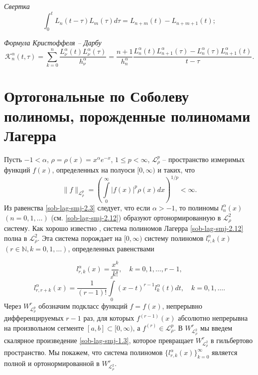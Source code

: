 \textit{Свертка}
\begin{equation}
\label{sob-lag-smj-2.15}
\int_0^{t} L_{n}(t-\tau) L_{m}(\tau) d\tau = L_{n+m}(t) - L_{n+m+1}(t);
\end{equation}

\textit{Формула Кристоффеля -- Дарбу}
\begin{equation}\label{sob-lag-smj-2.16}
\mathcal{K}_n^\alpha(t,\tau)=
\sum\limits_{k=0}^{n}\frac{L_\nu^\alpha(t)L_\nu^\alpha(\tau)}{h_\nu^\alpha}=
\frac{n+1}{h_n^\alpha}
\frac{L_n^\alpha(t)L_{n+1}^\alpha(\tau) - L_n^\alpha(\tau)L_{n+1}^\alpha(t)}{t-\tau}.
\end{equation}





\section{Ортогональные по Соболеву полиномы, порожденные полиномами Лагерра}
Пусть $-1<\alpha$,  $\rho=\rho(x)=x^\alpha e^{-x}$, $1\le p<\infty $,  $\mathcal{L}_{\rho}^p$ -- пространство измеримых функций $f(x)$, определенных на полуоси $[0,\infty)$ и таких, что
     $$
\|f\|_{\mathcal{L}_{\rho}^p}=
\left(\int\limits_0^\infty|f(x)|^p\rho(x)dx\right)^{1/p}<\infty.
    $$
Из равенства \eqref{sob-lag-smj-2.3} следует, что если $\alpha>-1$, то полиномы $l_n^{\alpha}(x)$ $(n=0,1,\ldots)$ (см. \eqref{sob-lag-smj-2.12})
образуют ортонормированную  в $\mathcal{L}_\rho^2$  систему. Как хорошо известно \cite{Haar-Tcheb-Sege}, система полиномов Лагерра  \eqref{sob-lag-smj-2.12} полна в $\mathcal{L}_\rho^2$.   Эта система порождает на $[0,\infty)$ систему полиномов $l_{r,k}^{\alpha}(x)$ $(r \in \mathbb{N}, k=0,1,\ldots)$, определенных равенствами

  \begin{equation}\label{sob-lag-smj-3.1}
l_{r,k}^{\alpha}(x) =\frac{x^k}{k!}, \quad k=0,1,\ldots, r-1,
\end{equation}
  \begin{equation}\label{sob-lag-smj-3.2}
l_{r,r+k}^{\alpha}(x) =\frac{1}{(r-1)!}\int\limits_{0}^x(x-t)^{r-1}l_{k}^{\alpha}(t)dt, \quad k=0,1,\ldots.
\end{equation}
 Через $W_{\mathcal{L}_{\rho}^p}^r$ обозначим  подкласс функций $f=f(x)$,
непрерывно дифференцируемых $r-1$ раз, для которых $f^{(r-1)}(x)$
абсолютно непрерывна на произвольном сегменте $[a,b]\subset[0,\infty)$,
а $f^{(r)}\in \mathcal{L}_{\rho}^p$. В $W_{\mathcal{L}_{\rho}^2}^r$ мы введем скалярное произведение \eqref{sob-lag-smj-1.3}, которое превращает $W_{\mathcal{L}_{\rho}^2}^r$ в гильбертово пространство.
Мы покажем, что система полиномов $\{l_{r,k}^{\alpha}(x)\}_{k=0}^\infty$ является полной и ортонормированной в $W_{\mathcal{L}_{\rho}^2}^r$.

